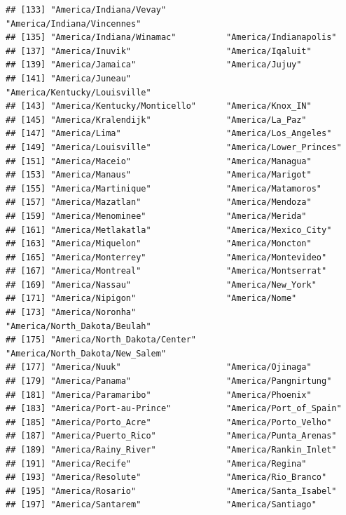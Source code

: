 \documentclass[
]{book}
\begin{document}
\begin{verbatim}
## [133] "America/Indiana/Vevay"            "America/Indiana/Vincennes"       
## [135] "America/Indiana/Winamac"          "America/Indianapolis"            
## [137] "America/Inuvik"                   "America/Iqaluit"                 
## [139] "America/Jamaica"                  "America/Jujuy"                   
## [141] "America/Juneau"                   "America/Kentucky/Louisville"     
## [143] "America/Kentucky/Monticello"      "America/Knox_IN"                 
## [145] "America/Kralendijk"               "America/La_Paz"                  
## [147] "America/Lima"                     "America/Los_Angeles"             
## [149] "America/Louisville"               "America/Lower_Princes"           
## [151] "America/Maceio"                   "America/Managua"                 
## [153] "America/Manaus"                   "America/Marigot"                 
## [155] "America/Martinique"               "America/Matamoros"               
## [157] "America/Mazatlan"                 "America/Mendoza"                 
## [159] "America/Menominee"                "America/Merida"                  
## [161] "America/Metlakatla"               "America/Mexico_City"             
## [163] "America/Miquelon"                 "America/Moncton"                 
## [165] "America/Monterrey"                "America/Montevideo"              
## [167] "America/Montreal"                 "America/Montserrat"              
## [169] "America/Nassau"                   "America/New_York"                
## [171] "America/Nipigon"                  "America/Nome"                    
## [173] "America/Noronha"                  "America/North_Dakota/Beulah"     
## [175] "America/North_Dakota/Center"      "America/North_Dakota/New_Salem"  
## [177] "America/Nuuk"                     "America/Ojinaga"                 
## [179] "America/Panama"                   "America/Pangnirtung"             
## [181] "America/Paramaribo"               "America/Phoenix"                 
## [183] "America/Port-au-Prince"           "America/Port_of_Spain"           
## [185] "America/Porto_Acre"               "America/Porto_Velho"             
## [187] "America/Puerto_Rico"              "America/Punta_Arenas"            
## [189] "America/Rainy_River"              "America/Rankin_Inlet"            
## [191] "America/Recife"                   "America/Regina"                  
## [193] "America/Resolute"                 "America/Rio_Branco"              
## [195] "America/Rosario"                  "America/Santa_Isabel"            
## [197] "America/Santarem"                 "America/Santiago"                

\end{verbatim}
\end{document}
